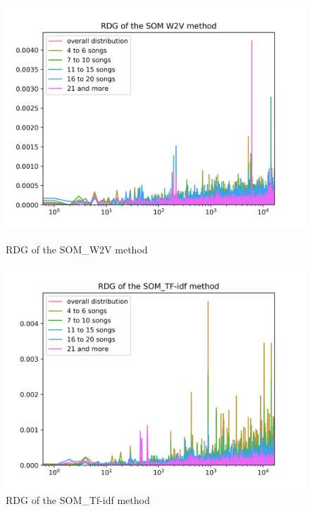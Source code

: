 \begin{figure}[H]
\centering
\begin{minipage}{.45\textwidth}
  \centering
  	\includegraphics[width=1\linewidth]{./img/som_w2v_graph.png}
	\caption{RDG of the SOM\_W2V method}
	\label{fig:som_distribution}
\end{minipage}%
 \vspace{1cm}
\begin{minipage}{.45\textwidth}
  \centering
  \includegraphics[width=1\linewidth]{./img/som_tf_idf_graph.png}
  \caption{RDG of the SOM\_Tf-idf method}
  \label{fig:som_tf_idf_distribution}
\end{minipage}
\end{figure}

